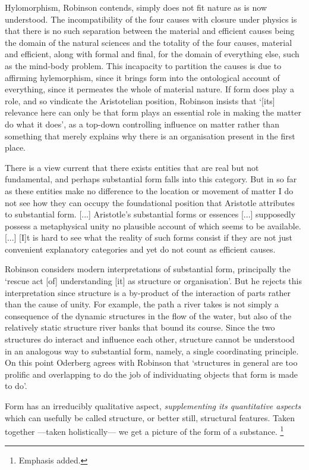 Hylomorphism, Robinson contends, simply does not fit nature as is now understood. The incompatibility of the four causes with closure under physics is that there is no such separation between the material and efficient causes being the domain of the natural sciences and the totality of the four causes, material and efficient, along with formal and final, for the domain of everything else, such as the mind-body problem. This incapacity to partition the causes is due to affirming hylemorphism, since it brings form into the ontological account of everything, since it permeates the whole of material nature.
If form does play a role, and so vindicate the Aristotelian position, Robinson insists that `[its] relevance here can only be that form plays an essential role in making the matter do what it does', as a top-down controlling influence on matter rather than something that merely explains why there is an organisation present in the first place.
\begin{quoting}
There is a view current that there exists entities that are real but not fundamental, and perhaps substantial form falls into this category. But in so far as these entities make no difference to the location or movement of matter I do not see how they can occupy the foundational position that Aristotle attributes to substantial form. [...] Aristotle's substantial forms or essences [...] supposedly possess a metaphysical unity no plausible account of which seems to be available. [...] [I]t is hard to see what the reality of such forms consist if they are not just convenient explanatory categories and yet do not count as efficient causes. \parencite[][5]{Robinson2018-talk}
\end{quoting}

Robinson considers modern interpretations of substantial form, principally the `rescue act [of] understanding [it] as structure or organisation'. But he rejects this interpretation since structure is a by-product of the interaction of parts rather than the cause of unity. For example,  the path a river takes is not simply a consequence of the dynamic structures in the flow of the water, but also of the relatively static structure river banks that bound its course. Since the two structures do interact and influence each other, structure cannot be understood in an analogous way to substantial form, namely, a single coordinating principle.
On this point Oderberg agrees with Robinson that `structures in general are too prolific and overlapping to do the job of individuating objects that form is made to do'. \parencite[][7]{Robinson2018-talk}
\begin{quoting}
Form has an irreducibly qualitative aspect, \emph{supplementing its quantitative aspects} which can usefully be called structure, or better still, structural features. Taken together ---taken holistically---  we get a picture of the form of a substance. \parencite[][178]{Oderberg2014-ODEIFS}\footnote{Emphasis added.}
\end{quoting}

